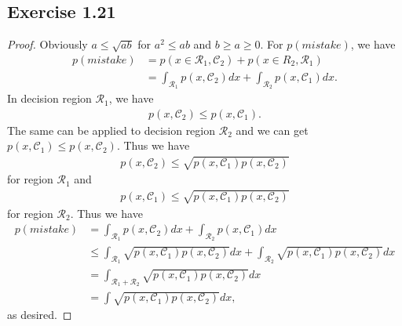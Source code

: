 \documentclass[11pt]{article}
\theoremstyle{definition}
\begin{document}
\subsection{Exercise 1.21}
\begin{proof}
Obviously $a \leq \sqrt{ab}$ for $a^2 \leq ab$ and $b \geq a \geq 0$.  For $p(mistake)$, we have
\begin{align*}
p(mistake) &= p(x\in \mathcal{R}_1, \mathcal{C}_2) + p(x\in R_2, \mathcal{R}_1) \\
&= \int_{\mathcal{R}_1}p(x,\mathcal{C}_2)dx + \int_{\mathcal{R}_2}p(x,\mathcal{C}_1)dx.
\end{align*}
In decision region $\mathcal{R}_1$, we have
\begin{align*}
p(x,\mathcal{C}_2) \leq p(x,\mathcal{C}_1).
\end{align*}
The same can be applied to decision region $\mathcal{R}_2$ and we can get $p(x,\mathcal{C}_1) \leq p(x,\mathcal{C}_2)$. Thus we have
\begin{align*}
p(x,\mathcal{C}_2) \leq \sqrt{p(x,\mathcal{C}_1)p(x,\mathcal{C}_2)}
\end{align*}
for region $\mathcal{R}_1$ and 
\begin{align*}
p(x,\mathcal{C}_1) \leq \sqrt{p(x,\mathcal{C}_1)p(x,\mathcal{C}_2)}
\end{align*}
for region $\mathcal{R}_2$. Thus we have
\begin{align*}
p(mistake) &= \int_{\mathcal{R}_1}p(x,\mathcal{C}_2)dx + \int_{\mathcal{R}_2}p(x,\mathcal{C}_1)dx \\
&\leq \int_{\mathcal{R}_1}\sqrt{p(x,\mathcal{C}_1)p(x,\mathcal{C}_2)}dx + \int_{\mathcal{R}_2}\sqrt{p(x,\mathcal{C}_1)p(x,\mathcal{C}_2)}dx \\
&= \int_{\mathcal{R}_1+\mathcal{R}_2}\sqrt{p(x,\mathcal{C}_1)p(x,\mathcal{C}_2)}dx \\
&= \int\sqrt{p(x,\mathcal{C}_1)p(x,\mathcal{C}_2)}dx,
\end{align*}
as desired.
\end{proof}
\end{document}
